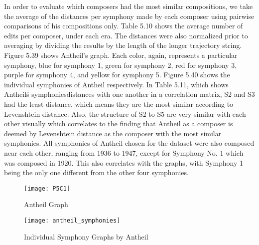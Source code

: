 In order to evaluate which composers had the most similar compositions, we take the average of the distances per symphony made by each composer using pairwise comparisons of his compositions only. Table 5.10 shows the average number of edits per composer, under each era. The distances were also normalized prior to averaging by dividing the results by the length of the longer trajectory string. Figure 5.39 shows Antheil's graph. Each color, again, represents a particular symphony, blue for symphony 1, green for symphony 2, red for symphony 3, purple for symphony 4, and yellow for symphony 5. Figure 5.40 shows the individual symphonies of Antheil respectively. In Table 5.11, which shows Antheil\'s symphonies\' distances with one another in a correlation matrix, S2 and S3 had the least distance, which means they are the most similar according to Levenshtein distance. Also, the structure of S2 to S5 are very similar with each other visually which correlates to the finding that Antheil as a composer is deemed by Levenshtein distance as the composer with the most similar symphonies. All symphonies of Antheil chosen for the dataset were also composed near each other, ranging from 1936 to 1947, except for Symphony No. 1 which was composed in 1920. This also correlates with the graphs, with Symphony 1 being the only one different from the other four symphonies.

\begin{figure}[H]
\caption{Antheil Graph}
\centering
\texttt{[image: P5C1]}
\end{figure}

\begin{figure}[H]
\caption{Individual Symphony Graphs by Antheil}
\centering
\texttt{[image: antheil\_symphonies]}
\end{figure}

